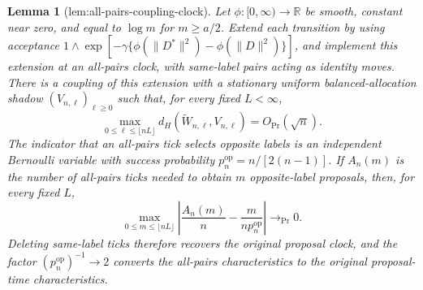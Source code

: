 \documentclass{article}
\newtheorem{lemma}{Lemma}
\begin{document}
\begin{lemma}[lem:all-pairs-coupling-clock]\label{lem:all-pairs-coupling-clock}
Let \(\phi:[0,\infty)\to\mathbb R\) be smooth, constant near zero, and equal to \(\log m\) for \(m\ge a/2\).  Extend each transition by using acceptance \(1\wedge\exp[-\gamma\{\phi(\|D^*\|^2)-\phi(\|D\|^2)\}]\), and implement this extension at an all-pairs clock, with same-label pairs acting as identity moves.  There is a coupling of this extension with a stationary uniform balanced-allocation shadow \((V_{n,\ell})_{\ell\ge0}\) such that, for every fixed \(L<\infty\),
\[
 \max_{0\le\ell\le\lfloor nL\rfloor}d_H(\widetilde W_{n,\ell},V_{n,\ell})=O_{\Pr}(\sqrt n).
\]
The indicator that an all-pairs tick selects opposite labels is an independent Bernoulli variable with success probability \(p_n^{\mathrm{op}}=n/[2(n-1)]\).  If \(A_n(m)\) is the number of all-pairs ticks needed to obtain \(m\) opposite-label proposals, then, for every fixed \(L\),
\[
 \max_{0\le m\le\lfloor nL\rfloor}\left|\frac{A_n(m)}n-\frac{m}{np_n^{\mathrm{op}}}\right|\longrightarrow_{\Pr}0.
\]
Deleting same-label ticks therefore recovers the original proposal clock, and the factor \((p_n^{\mathrm{op}})^{-1}\to2\) converts the all-pairs characteristics to the original proposal-time characteristics.
\end{lemma}
\end{document}
